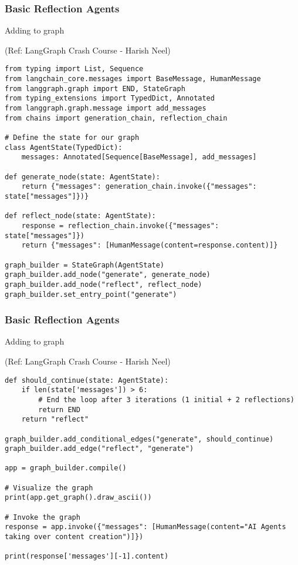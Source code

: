\begin{frame}[fragile]\frametitle{Basic Reflection Agents}

Adding to graph

{\tiny (Ref: LangGraph Crash Course - Harish Neel)}

\begin{lstlisting}[basicstyle=\scriptsize\ttfamily]
from typing import List, Sequence
from langchain_core.messages import BaseMessage, HumanMessage
from langgraph.graph import END, StateGraph
from typing_extensions import TypedDict, Annotated
from langgraph.graph.message import add_messages
from chains import generation_chain, reflection_chain

# Define the state for our graph
class AgentState(TypedDict):
    messages: Annotated[Sequence[BaseMessage], add_messages]

def generate_node(state: AgentState):
    return {"messages": generation_chain.invoke({"messages": state["messages"]})}

def reflect_node(state: AgentState):
    response = reflection_chain.invoke({"messages": state["messages"]})
    return {"messages": [HumanMessage(content=response.content)]}

graph_builder = StateGraph(AgentState)
graph_builder.add_node("generate", generate_node)
graph_builder.add_node("reflect", reflect_node)
graph_builder.set_entry_point("generate")
\end{lstlisting}
\end{frame}

\begin{frame}[fragile]\frametitle{Basic Reflection Agents}

Adding to graph

{\tiny (Ref: LangGraph Crash Course - Harish Neel)}

\begin{lstlisting}[basicstyle=\scriptsize\ttfamily]
def should_continue(state: AgentState):
    if len(state['messages']) > 6:
        # End the loop after 3 iterations (1 initial + 2 reflections)
        return END 
    return "reflect"

graph_builder.add_conditional_edges("generate", should_continue)
graph_builder.add_edge("reflect", "generate")

app = graph_builder.compile()

# Visualize the graph
print(app.get_graph().draw_ascii())

# Invoke the graph
response = app.invoke({"messages": [HumanMessage(content="AI Agents taking over content creation")]})

print(response['messages'][-1].content)
\end{lstlisting}
\end{frame}


